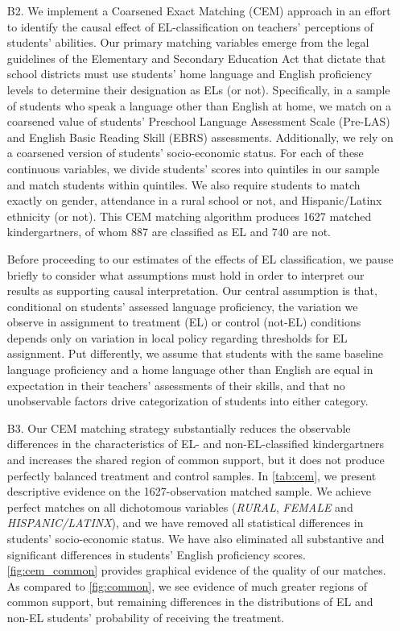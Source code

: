 \documentclass[a4paper, 11pt]{article}
\begin{document}
\begin{enumerate}
	\item[B2.] We implement a Coarsened Exact Matching (CEM) approach in an effort to identify the causal effect of EL-classification on teachers' perceptions of students' abilities. Our primary matching variables emerge from the legal guidelines of the Elementary and Secondary Education Act that dictate that school districts must use students' home language and English proficiency levels to determine their designation as ELs (or not). Specifically, in a sample of students who speak a language other than English at home, we match on a coarsened value of students' Preschool Language Assessment Scale (Pre-LAS) and English Basic Reading Skill (EBRS) assessments. Additionally, we rely on a coarsened version of students' socio-economic status.  For each of these continuous variables, we divide students' scores into quintiles in our sample and match students within quintiles. We also require students to match exactly on gender, attendance in a rural school or not, and Hispanic/Latinx ethnicity (or not). This CEM matching algorithm produces 1627 matched kindergartners, of whom 887 are classified as EL and 740 are not. 
	
	Before proceeding to our estimates of the effects of EL classification, we pause briefly to consider what assumptions must hold in order to interpret our results as supporting causal interpretation. Our central assumption is that, conditional on students' assessed language proficiency, the variation we observe in assignment to treatment (EL) or control (not-EL) conditions depends only on variation in local policy regarding thresholds for EL assignment. Put differently, we assume that students with the same baseline language proficiency and a home language other than English are equal in expectation in their teachers' assessments of their skills, and that no unobservable factors drive categorization of students into either category.
	

	\item[B3.] Our CEM matching strategy substantially reduces the observable differences in the characteristics of EL- and non-EL-classified kindergartners and increases the shared region of common support, but it does not produce perfectly balanced treatment and control samples. In \autoref{tab:cem}, we present descriptive evidence on the 1627-observation matched sample. We achieve perfect matches on all dichotomous variables (\textit{RURAL}, \textit{FEMALE} and \textit{HISPANIC/LATINX}), and we have removed all statistical differences in students' socio-economic status. We have also eliminated all substantive and significant differences in students' English proficiency scores. \autoref{fig:cem_common} provides graphical evidence of the quality of our matches. As compared to \autoref{fig:common}, we see evidence of much greater regions of common support, but remaining differences in the distributions of EL and non-EL students' probability of receiving the treatment.


\end{enumerate}
\end{document}
